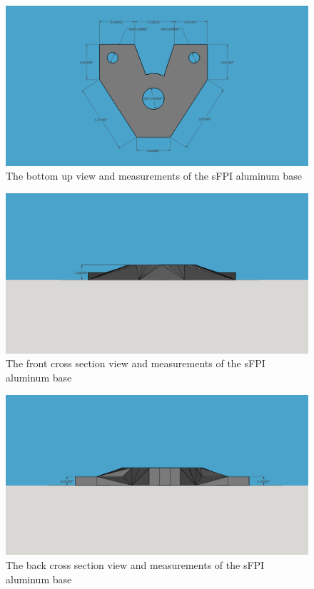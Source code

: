 \documentclass[12pt,journal]{IEEEtran}
\begin{document}
\begin{appendices}
\begin{figure}[h!]
  \centering
	\includegraphics[width=\textwidth]{./mechanical/diode_holder_bottom.png}
	\caption[Cavity Mounts]{The bottom up view and measurements of the sFPI aluminum base}
	\label{fig:diode_holder-bottom}
\end{figure}  

\begin{figure}[h!]
  \centering
	\includegraphics[width=\textwidth]{./mechanical/diode_holder_front.png}
	\caption[Cavity Mounts]{The front cross section view and measurements of the sFPI aluminum base}
	\label{fig:diode_holder-front}
\end{figure} 

\begin{figure}[h!]
  \centering
	\includegraphics[width=\textwidth]{./mechanical/diode_holder_back.png}
	\caption[Cavity Mounts]{The back cross section view and measurements of the sFPI aluminum base}
	\label{fig:diode_holder-back}
\end{figure}  


\end{appendices}
\end{document}
